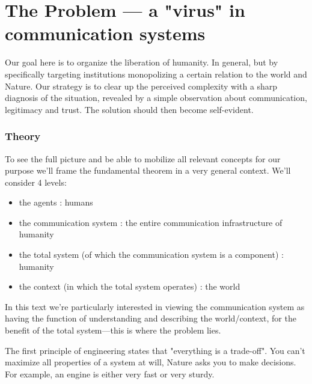 \documentclass[11pt]{article}
\begin{document}
\par\bigskip

\section*{The Problem --- a "virus" in communication systems}

Our goal here is to organize the liberation of humanity. In general, but by specifically
targeting institutions monopolizing a certain relation to the world and Nature. Our
strategy is to clear up the perceived complexity with a sharp diagnosis of the
situation, revealed by a simple observation about communication, legitimacy and trust.
The solution should then become self-evident.

\subsubsection*{Theory}

To see the full picture and be able to mobilize all relevant concepts for our purpose
we'll frame the fundamental theorem in a very general context. We'll consider 4 levels:

\begin{itemize}

\item the agents : humans

\item the communication system : the entire communication infrastructure of humanity

\item the total system (of which the communication system is a component) : humanity

\item the context (in which the total system operates) : the world

\end{itemize}

In this text we're particularly interested in viewing the communication system as having
the function of understanding and describing the world/context, for the benefit of the
total system---this is where the problem lies.

The first principle of engineering states that "everything is a trade-off". You can't
maximize all properties of a system at will, Nature asks you to make decisions. For
example, an engine is either very fast or very sturdy.

\par\bigskip
\end{document}
